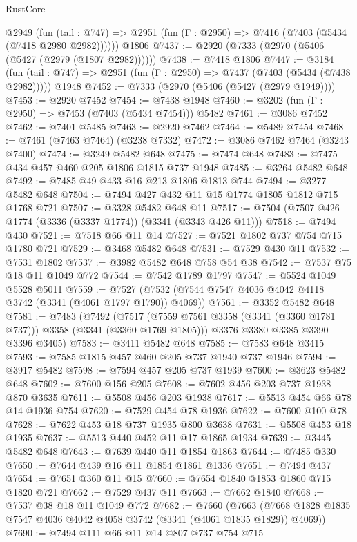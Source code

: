 \begin{lexlean}{RustCore}
\begin{coremodule}
    @2949
      (fun (tail : @747) => @2951 (fun (Γ : @2950) => @7416 (@7403 (@5434 (@7418 @2980 @2982))))))
    @1806
@7437 := @2920 (@7333 (@2970 (@5406 (@5427 (@2979 (@1807 @2982))))))
@7438 := @7418 @1806
@7447 := @3184
    (fun (tail : @747) => @2951 (fun (Γ : @2950) => @7437 (@7403 (@5434 (@7438 @2982)))))
    @1948
@7452 := @7333 (@2970 (@5406 (@5427 (@2979 @1949))))
@7453 := @2920 @7452
@7454 := @7438 @1948
@7460 := @3202 (fun (Γ : @2950) => @7453 (@7403 (@5434 @7454))) @5482
@7461 := @3086 @7452
@7462 := @7401 @5485
@7463 := @2920 @7462
@7464 := @5489 @7454
@7468 := @7461 (@7463 @7464) (@3238 @7332)
@7472 := @3086 @7462 @7464 (@3243 @7400)
@7474 := @3249 @5482 @648
@7475 := @7474 @648
@7483 := @7475 @434 @457 @460 @205 @1806 @1815 @737 @1948
@7485 := @3264 @5482 @648
@7492 := @7485 @49 @433 @16 @213 @1806 @1813 @744
@7494 := @3277 @5482 @648
@7504 := @7494 @427 @432 @11 @15 @1774 @1805 @1812 @715 @1768 @721
@7507 := @3328 @5482 @648 @11
@7517 := @7504 (@7507 @426 @1774 (@3336 (@3337 @1774)) (@3341 (@3343 @426 @11)))
@7518 := @7494 @430
@7521 := @7518 @66 @11 @14
@7527 := @7521 @1802 @737 @754 @715 @1780 @721
@7529 := @3468 @5482 @648
@7531 := @7529 @430 @11
@7532 := @7531 @1802
@7537 := @3982 @5482 @648 @758 @54 @38
@7542 := @7537 @75 @18 @11 @1049 @772
@7544 := @7542 @1789 @1797
@7547 := @5524 @1049 @5528 @5011
@7559 := @7527 (@7532 (@7544 @7547 @4036 @4042 @4118 @3742 (@3341 (@4061 @1797 @1790)) @4069))
@7561 := @3352 @5482 @648
@7581 := @7483
    (@7492
      (@7517 (@7559 @7561 @3358 (@3341 (@3360 @1781 @737))) @3358 (@3341 (@3360 @1769 @1805)))
      @3376
      @3380
      @3385
      @3390
      @3396
      @3405)
@7583 := @3411 @5482 @648
@7585 := @7583 @648 @3415
@7593 := @7585 @1815 @457 @460 @205 @737 @1940 @737 @1946
@7594 := @3917 @5482
@7598 := @7594 @457 @205 @737 @1939
@7600 := @3623 @5482 @648
@7602 := @7600 @156 @205
@7608 := @7602 @456 @203 @737 @1938 @870 @3635
@7611 := @5508 @456 @203 @1938
@7617 := @5513 @454 @66 @78 @14 @1936 @754
@7620 := @7529 @454 @78 @1936
@7622 := @7600 @100 @78
@7628 := @7622 @453 @18 @737 @1935 @800 @3638
@7631 := @5508 @453 @18 @1935
@7637 := @5513 @440 @452 @11 @17 @1865 @1934
@7639 := @3445 @5482 @648
@7643 := @7639 @440 @11 @1854 @1863
@7644 := @7485 @330
@7650 := @7644 @439 @16 @11 @1854 @1861 @1336
@7651 := @7494 @437
@7654 := @7651 @360 @11 @15
@7660 := @7654 @1840 @1853 @1860 @715 @1820 @721
@7662 := @7529 @437 @11
@7663 := @7662 @1840
@7668 := @7537 @38 @18 @11 @1049 @772
@7682 := @7660
    (@7663 (@7668 @1828 @1835 @7547 @4036 @4042 @4058 @3742 (@3341 (@4061 @1835 @1829)) @4069))
@7690 := @7494 @111 @66 @11 @14 @807 @737 @754 @715

\end{coremodule}
\end{lexlean}
